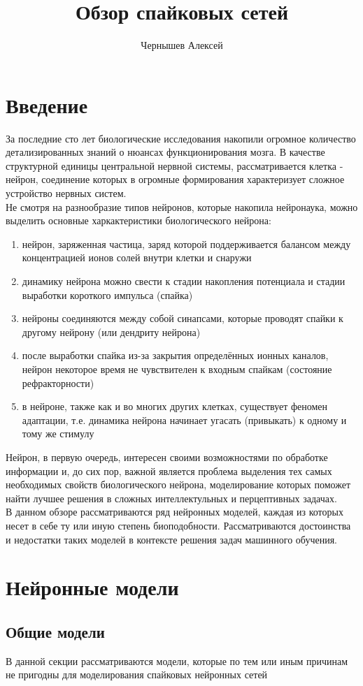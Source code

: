 \documentclass[a4paper,10pt]{article}
\title{Обзор спайковых сетей}
\author{Чернышев Алексей}
\begin{document}


\tableofcontents
\clearpage
\section{Введение}
	\indent За последние сто лет биологические исследования накопили огромное количество детализированных знаний о нюансах функционирования мозга. В качестве структурной единицы центральной нервной системы, рассматривается клетка - нейрон, соединение которых в огромные формирования характеризует сложное  устройство нервных систем.\\
	\indent Не смотря на разнообразие типов нейронов, которые накопила нейронаука, можно выделить основные харкактеристики биологического нейрона:
	\begin{enumerate}
	\item нейрон, заряженная частица, заряд которой поддерживается балансом между концентрацией ионов солей внутри клетки и снаружи
	\item динамику нейрона можно свести к стадии накопления потенциала и стадии выработки короткого импульса	 (спайка)
	\item нейроны соединяются между собой синапсами, которые проводят спайки к другому нейрону (или дендриту нейрона)
	\item после выработки спайка из-за закрытия определённых ионных каналов, нейрон некоторое время не чувствителен к входным спайкам (состояние рефракторности)
	\item в нейроне, также как и во многих других клетках, существует феномен адаптации, т.е. динамика нейрона начинает угасать (привыкать) к одному и тому же стимулу
	\end{enumerate}
	Нейрон, в первую очередь, интересен своими возможностями по обработке информации и, до сих пор, важной является проблема выделения тех самых необходимых свойств биологического нейрона, моделирование которых поможет найти лучшее решения в сложных интеллектульных и перцептивных задачах.\\
	\indent В данном обзоре рассматриваются ряд нейронных моделей, каждая из которых несет в себе ту или иную степень биоподобности. Рассматриваются достоинства и недостатки таких моделей в контексте решения задач машинного обучения.

\section{Нейронные модели}
\subsection{Общие модели}
В данной секции рассматриваются модели, которые по тем или иным причинам не пригодны для моделирования спайковых нейронных сетей
\end{document}
